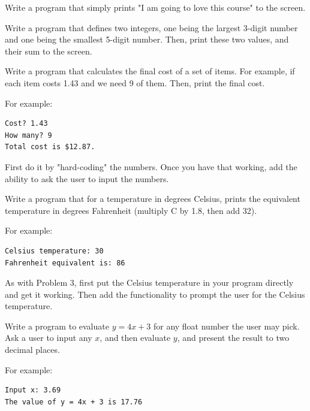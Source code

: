 \documentclass{../pset}
\begin{document}
\begin{problem}
Write a program that simply prints "I am going to love this course" to the screen.
\end{problem}

\begin{problem}
Write a program that defines two integers, one being the largest 3-digit number and one being the smallest 5-digit number. Then, print these two values, and their sum to the
screen.
\end{problem}

\begin{problem}
Write a program that calculates the final cost of a set of items. For example, if each item costs 1.43 and we need 9 of them. Then, print the final cost.  

For example:
\begin{lstlisting}[language={}]
Cost? 1.43
How many? 9
Total cost is $12.87.
\end{lstlisting}


First do it by "hard-coding" the numbers. Once you have that working, add the ability to ask the user to input the numbers.
\end{problem}

\begin{problem}
Write a program that for a temperature in degrees Celsius, prints the equivalent temperature in degrees Fahrenheit (multiply C by 1.8, then add 32).  

For example:
\begin{lstlisting}[language={}]
Celsius temperature: 30
Fahrenheit equivalent is: 86
\end{lstlisting}

As with Problem 3, first put the Celsius temperature in your program directly and get it
working. Then add the functionality to prompt the user for the Celsius temperature.
\end{problem}

\begin{problem}
Write a program to evaluate $y = 4x + 3$ for any float number the user may pick. Ask a user to input any $x$, and then evaluate $y$, and present the result to two decimal places.

For example:
\begin{lstlisting}[language={}]
Input x: 3.69
The value of y = 4x + 3 is 17.76
\end{lstlisting}


\end{problem}
\end{document}
